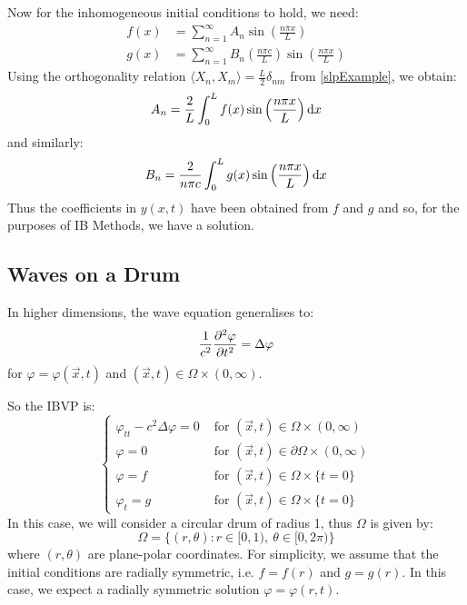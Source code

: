 \documentclass[../main.tex]{subfiles}
\begin{document}
Now for the inhomogeneous initial conditions to hold, we need:
\begin{align*}
  f(x) &= \sum_{n = 1}^{\infty} A_n \sin\left(\frac{n \pi x}{L}\right) \\
  g(x) &= \sum_{n = 1}^{\infty} B_n \left(\frac{n \pi c}{L}\right) \sin\left(\frac{n \pi x}{L}\right)
\end{align*}
Using the orthogonality relation $\langle X_n, X_m \rangle = \frac{L}{2} \delta_{n m}$ from \cref{slpExample}, we obtain:
\[
  A_n = \frac{2}{L} \int_{0}^{L} f(x) \sin\left(\frac{n \pi x}{L}\right) \d{x}
\]
and similarly:
\[
  B_n = \frac{2}{n \pi c} \int_{0}^{L} g(x) \sin\left(\frac{n \pi x}{L}\right) \d{x}
\]
Thus the coefficients in $y(x, t)$ have been obtained from $f$ and $g$ and so, for the purposes of IB Methods, we have a solution.
\subsection{Waves on a Drum}
In higher dimensions, the wave equation generalises to:
\[
  \frac{1}{c^2} \pderiv[2]{\varphi}{t} = \Delta \varphi
\]
for $\varphi = \varphi(\vec{x}, t)$ and $(\vec{x}, t) \in \Omega \times (0, \infty)$.

So the IBVP is:
\[
  \begin{cases}
  \varphi_{t t} - c^2 \Delta \varphi = 0 & \text{ for } (\vec{x}, t) \in \Omega \times (0, \infty) \\
  \varphi = 0 & \text{ for } (\vec{x}, t) \in \partial \Omega \times (0, \infty) \\
  \varphi = f & \text{ for } (\vec{x}, t) \in \Omega \times \{t = 0\} \\
  \varphi_t = g & \text{ for } (\vec{x}, t) \in \Omega \times \{t = 0\}
  \end{cases}
\]
In this case, we will consider a circular drum of radius 1, thus $\Omega$ is given by:
\[
  \Omega = \{(r, \theta): r \in [0, 1),\ \theta \in [0, 2\pi)\}
\]
where $(r, \theta)$ are plane-polar coordinates.
For simplicity, we assume that the initial conditions are radially symmetric, i.e. $f = f(r)$ and $g = g(r)$.
In this case, we expect a radially symmetric solution $\varphi = \varphi(r, t)$.
\end{document}
